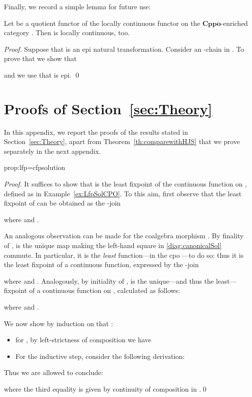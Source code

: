\documentclass[oribibl,envcountsame,envcountsect,runningheads]{llncs}
\newcommand{\cat}[1]{\ensuremath{\mathbf{#1}}}
\newcommand{\cppo}{\cat{Cppo}}
\renewcommand{\>}{\rangle}
\newenvironment{proposition_for}[2][\empty]{\bigskip\noindent{\bf
    Proposition~\ref{#2}}\ifthenelse{\equal{#1}{\empty}}{{\bf.}}{ {\bf
      (#1).}}\it}{\vspace{0.5cm}}
\begin{document}
Finally, we record a simple lemma for future use:

\begin{proposition}
  \label{lem:quot}
 Let  be a quotient functor of the locally continuous functor  on the \cppo-enriched category . Then  is locally continuous, too.
\end{proposition}
\begin{proof}
 Suppose that  is an epi natural transformation.
 Consider an -chain  in . To prove that  we show that

and we use that  is epi.
\qed
\end{proof}










\section{Proofs of Section~\ref{sec:Theory}}\label{App:proofsTheory}

In this appendix, we report the proofs of the results stated in Section~\ref{sec:Theory}, apart from Theorem~\ref{th:comparewithHJS} that we prove separately in the next appendix.

\begin{proposition_for}{prop:lfp=cfpsolution}
\proplfpcfpsolution
\end{proposition_for}
\begin{proof} It suffices to show that  is the least fixpoint of the continuous function  on , defined as in Example~\ref{ex:LfpSolCPO}. To this aim, first observe that the least fixpoint of  can be obtained as the -join

where  and .

An analogous observation can be made for the coalgebra morphism . By finality of ,  is the unique map making the left-hand square in \eqref{diag:canonicalSol} commute. In particular, it is the \emph{least} function---in the cpo ---to do so: thus it is the least fixpoint of a continuous function, expressed by the -join

 where  and .
 Analogously, by initiality of ,  is the unique---and thus the least---fixpoint of a continuous function on , calculated as follows:

 where  and .

\noindent We now show by induction on  that :
\begin{itemize}
  \item for , by left-strictness of composition we have
      
  \item For the inductive step, consider the following derivation:
      
\end{itemize}

\noindent Thus we are allowed to conclude:

where the third equality is given by continuity of composition in .\qed
\end{proof}
\end{document}

